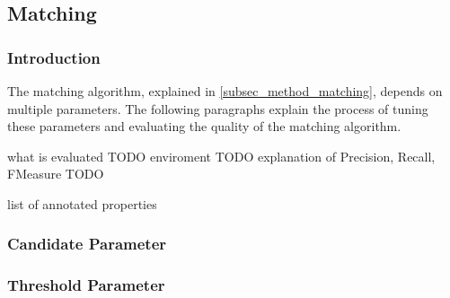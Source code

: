 \subsection{Matching}
\label{subsec_evaluation_matching}

\subsubsection{Introduction}
The matching algorithm, explained in \ref{subsec_method_matching}, depends on multiple parameters. The following paragraphs explain the process of tuning these parameters and evaluating the quality of the matching algorithm.

what is evaluated TODO
enviroment TODO
explanation of Precision, Recall, FMeasure TODO

list of annotated properties 

\subsubsection{Candidate Parameter}
\subsubsection{Threshold Parameter}